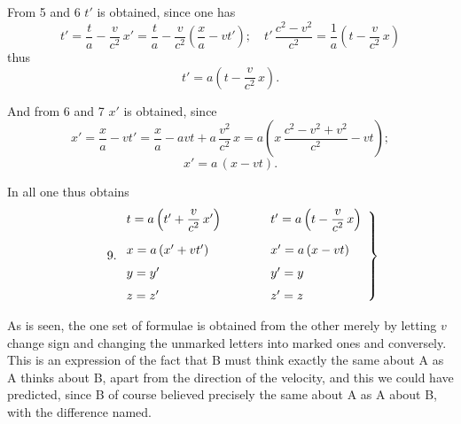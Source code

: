 \documentclass[12pt,a4paper]{article}
\begin{document}
From 5 and 6 $t'$ is obtained, since one has
\[
  t' = \frac{t}{a} - \frac{v}{c^{2}}\,x'
     = \frac{t}{a} - \frac{v}{c^{2}}\left(\frac{x}{a} - vt'\right);\quad
  t'\,\frac{c^{2}-v^{2}}{c^{2}}
     = \frac{1}{a}\left(t - \frac{v}{c^{2}}\,x\right)
\]
thus
\begin{equation}\tag*{7.}
  t' = a\left(t - \frac{v}{c^{2}}\,x\right).
\end{equation}

And from 6 and 7 $x'$ is obtained, since
\[
  x' = \frac{x}{a} - vt'
     = \frac{x}{a} - avt + a\,\frac{v^{2}}{c^{2}}\,x
     = a\left(x\,\frac{c^{2}-v^{2}+v^{2}}{c^{2}} - vt\right);
\]
\begin{equation}\tag*{8.}
  x' = a\,(x - vt).
\end{equation}

In all one thus obtains
\begin{equation}\tag*{9.}
  \left.
  \begin{array}{l@{\qquad\qquad}l}
    t = a\left(t' + \dfrac{v}{c^{2}}\,x'\right)
      & t' = a\left(t - \dfrac{v}{c^{2}}\,x\right)\\[3ex]
    x = a\,(x' + vt') & x' = a\,(x - vt)\\[1.5ex]
    y = y' & y' = y\\[1.5ex]
    z = z' & z' = z
  \end{array}
  \right\}
\end{equation}

As is seen, the one set of formulae is obtained from the other merely by
letting $v$ change sign and changing the unmarked letters into marked ones and
conversely. This is an expression of the fact that B must think exactly the
same
about A as A thinks about B, apart from the direction of the velocity, and
this we could have predicted, since B of course believed precisely the same
about A as A about B, with the difference named.
\end{document}
